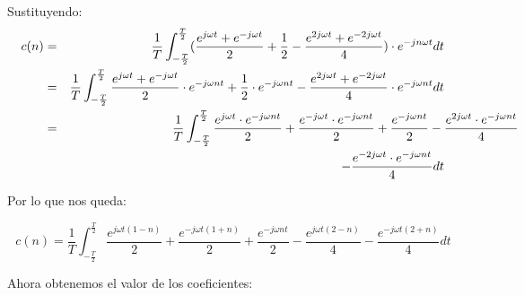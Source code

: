 \documentclass[a4paper,12pt]{article}
\begin{document}
\begin{enumerate}
  Sustituyendo:
  \begin{eqnarray*}
    c(n) & = & \frac{1}{T} \int_{-\frac{T}{2}}^{\frac{T}{2}} (\frac{e^{j \omega t} + e^{-j \omega t}}{2} + \frac{1}{2} -\frac{e^{2 j \omega t} + e^{-2 j \omega t}}{4}) \cdot e^{-j n \omega t} dt \\ & = & \frac{1}{T} \int_{-\frac{T}{2}}^{\frac{T}{2}} \frac{e^{j \omega t} + e^{-j \omega t}}{2} \cdot e^{-j \omega n t} + \frac{1}{2} \cdot e^{-j \omega n t} - \frac{e^{2 j \omega t} + e^{-2 j \omega t}}{4} \cdot e^{-j \omega n t} dt \\ & = & \frac{1}{T} \int_{-\frac{T}{2}}^{\frac{T}{2}} \frac{e^{j \omega t} \cdot e^{-j \omega n t}}{2} + \frac{e^{-j \omega t} \cdot e^{-j \omega n t}}{2} + \frac{e^{-j \omega n t}}{2} - \lefteqn{\frac{e^{2 j \omega t} \cdot e^{-j \omega n t}}{4}} \\ & & - \frac{e^{-2 j \omega t} \cdot e^{-j \omega n t}}{4} dt
  \end{eqnarray*}

  Por lo que nos queda:

  $$ c(n) = \frac{1}{T} \int_{-\frac{T}{2}}^{\frac{T}{2}} \frac{e^{j \omega t (1-n)}}{2} + \frac{e^{-j \omega t (1+n)}}{2} + \frac{e^{-j \omega n t}}{2} - \frac{e^{j \omega t (2-n)}}{4} - \frac{e^{-j \omega t (2+n)}}{4} dt $$

  Ahora obtenemos el valor de los coeficientes:


\end{enumerate}
\end{document}
